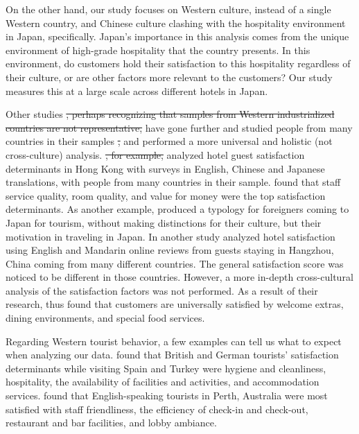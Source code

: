 \documentclass[smallextended,natbib]{svjour3}       %
\providecommand{\DIFadd}[1]{{\protect\color{blue}\uwave{#1}}} %
\providecommand{\DIFdel}[1]{{\protect\color{red}\sout{#1}}}                      %
\providecommand{\DIFaddbegin}{} %
\providecommand{\DIFaddend}{} %
\providecommand{\DIFdelbegin}{} %
\providecommand{\DIFdelend}{} %
\newcommand{\DIFscaledelfig}{0.5}
\newlength{\DIFdelgraphicswidth} %
\newlength{\DIFdelgraphicsheight} %
\newcommand{\DIFaddincludegraphics}[2][]{{\color{blue}\fbox{\DIFOincludegraphics[#1]{#2}}}} %
\newcommand{\DIFdelincludegraphics}[2][]{%
\sbox{\DIFdelgraphicsbox}{\DIFOincludegraphics[#1]{#2}}%
\settoboxwidth{\DIFdelgraphicswidth}{\DIFdelgraphicsbox} %
\settoboxtotalheight{\DIFdelgraphicsheight}{\DIFdelgraphicsbox} %
\scalebox{\DIFscaledelfig}{%
\parbox[b]{\DIFdelgraphicswidth}{\usebox{\DIFdelgraphicsbox}\\[-\baselineskip] \rule{\DIFdelgraphicswidth}{0em}}\llap{\resizebox{\DIFdelgraphicswidth}{\DIFdelgraphicsheight}{%
\setlength{\unitlength}{\DIFdelgraphicswidth}%
\begin{picture}(1,1)%
\thicklines\linethickness{2pt} %
{\color[rgb]{1,0,0}\put(0,0){\framebox(1,1){}}}%
{\color[rgb]{1,0,0}\put(0,0){\line( 1,1){1}}}%
{\color[rgb]{1,0,0}\put(0,1){\line(1,-1){1}}}%
\end{picture}%
}\hspace*{3pt}}} %
} %
\DeclareRobustCommand{\DIFaddbegin}{\DIFOaddbegin \let\includegraphics\DIFaddincludegraphics} %
\DeclareRobustCommand{\DIFaddend}{\DIFOaddend \let\includegraphics\DIFOincludegraphics} %
\DeclareRobustCommand{\DIFdelbegin}{\DIFOdelbegin \let\includegraphics\DIFdelincludegraphics} %
\DeclareRobustCommand{\DIFdelend}{\DIFOaddend \let\includegraphics\DIFOincludegraphics} %
\begin{document}
    On the other hand, our study focuses on Western culture, instead of a single Western country, and Chinese culture clashing with the hospitality environment in Japan, specifically. Japan's importance in this analysis comes from the unique environment of high-grade hospitality that the country presents. In this environment, do customers hold their satisfaction to this hospitality regardless of their culture, or are other factors more relevant to the customers? Our study measures this at a large scale across different hotels in Japan. 

    Other studies \DIFdelbegin \DIFdel{, perhaps recognizing that samples from Western industrialized countries are not representative, }\DIFdelend have gone further and studied people from many countries in their samples \DIFdelbegin \DIFdel{, }\DIFdelend and performed a more universal and holistic (not cross-culture) analysis. \cite{choi2001} \DIFdelbegin \DIFdel{, for example, }\DIFdelend analyzed hotel guest satisfaction determinants in Hong Kong with surveys in English, Chinese and Japanese translations, with people from many countries in their sample. \cite{choi2001} found that staff service quality, room quality, and value for money were the top satisfaction determinants. As another example, \cite{Uzama2012} produced a typology for foreigners coming to Japan for tourism, without making distinctions for their culture, but their motivation in traveling in Japan. In another study\DIFaddbegin \DIFadd{, }\DIFaddend \cite{zhou2014} analyzed hotel satisfaction using English and Mandarin online reviews from guests staying in Hangzhou, China coming from many different countries. The general satisfaction score was noticed to be different in those countries. However, a more in-depth cross-cultural analysis of the satisfaction factors was not performed. As a result of their research, \cite{zhou2014} thus found that customers are universally satisfied by welcome extras, dining environments, and special food services. 

    Regarding Western tourist behavior, a few examples can tell us what to expect when analyzing our data. \cite{kozak2002} found that British and German tourists' satisfaction determinants while visiting Spain and Turkey were hygiene and cleanliness, hospitality, the availability of facilities and activities, and accommodation services. \cite{shanka2004} found that English-speaking tourists in Perth, Australia were most satisfied with staff friendliness, the efficiency of check-in and check-out, restaurant and bar facilities, and lobby ambiance. 
\end{document}
